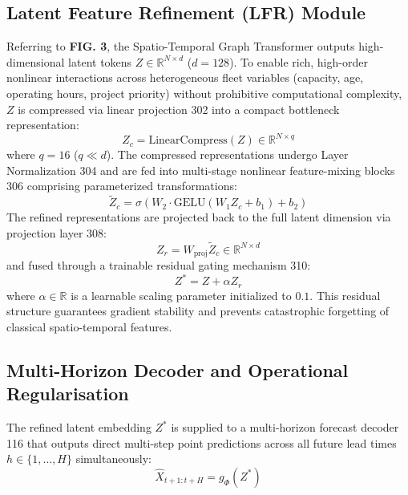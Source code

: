 \documentclass[11pt,a4paper]{article}
\begin{document}
\subsection{Latent Feature Refinement (LFR) Module}
\noindent Referring to \textbf{FIG. 3}, the Spatio-Temporal Graph Transformer outputs high-dimensional latent tokens $Z \in \mathbb{R}^{N \times d}$ ($d = 128$). To enable rich, high-order nonlinear interactions across heterogeneous fleet variables (capacity, age, operating hours, project priority) without prohibitive computational complexity, $Z$ is compressed via linear projection 302 into a compact bottleneck representation:
\begin{equation}
Z_c = \text{LinearCompress}(Z) \in \mathbb{R}^{N \times q} \label{eq:compress}
\end{equation}
where $q = 16$ ($q \ll d$). The compressed representations undergo Layer Normalization 304 and are fed into multi-stage nonlinear feature-mixing blocks 306 comprising parameterized transformations:
\begin{equation}
\widetilde{Z}_c = \sigma\left(W_2 \cdot \text{GELU}(W_1 Z_c + b_1) + b_2\right) \label{eq:mix}
\end{equation}
The refined representations are projected back to the full latent dimension via projection layer 308:
\begin{equation}
Z_r = W_{\text{proj}} \widetilde{Z}_c \in \mathbb{R}^{N \times d} \label{eq:expand}
\end{equation}
and fused through a trainable residual gating mechanism 310:
\begin{equation}
Z^* = Z + \alpha Z_r \label{eq:residual}
\end{equation}
where $\alpha \in \mathbb{R}$ is a learnable scaling parameter initialized to $0.1$. This residual structure guarantees gradient stability and prevents catastrophic forgetting of classical spatio-temporal features.

\subsection{Multi-Horizon Decoder and Operational Regularisation}
\noindent The refined latent embedding $Z^*$ is supplied to a multi-horizon forecast decoder 116 that outputs direct multi-step point predictions across all future lead times $h \in \{1, \dots, H\}$ simultaneously:
\begin{equation}
\widehat{X}_{t+1:t+H} = g_\Phi(Z^*) \label{eq:dec_spec}
\end{equation}
\end{document}
